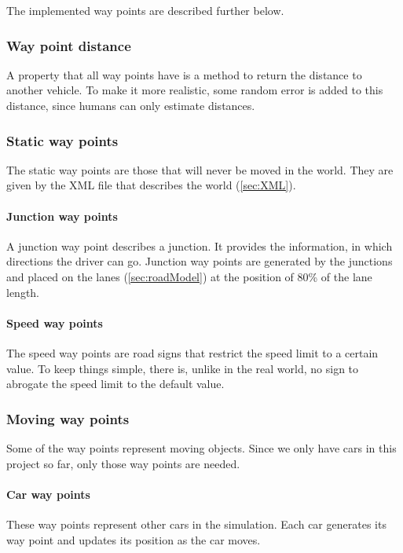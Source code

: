 \noindent The implemented way points are described further below. \\

\subsubsection{Way point distance}
\label{sec:movingWPDistance}
A property that all way points have is a method to 
return the distance to another vehicle. To make it more realistic, some random 
error is added to this distance, since humans can only estimate distances.

\subsubsection{Static way points}

The static way points are those that will never be moved in the world.
They are given by the XML file that describes the world (\ref{sec:XML}).

\paragraph{Junction way points}
A junction way point describes a junction. It provides the information, in
which directions the driver can go. Junction way points are generated by the
junctions and placed on the lanes (\ref{sec:roadModel}) at the position of
80\% of the lane length.

\paragraph{Speed way points}
The speed way points are road signs that restrict the speed limit to a certain
value. To keep things simple, there is, unlike in the real world, no sign to 
abrogate the speed limit to the default value. \\

\subsubsection{Moving way points}

Some of the way points represent moving objects. Since we only have cars in this
project so far, only those way points are needed. \\

\paragraph{Car way points}
These way points represent other cars in the simulation. Each car generates its
way point and updates its position as the car moves.

